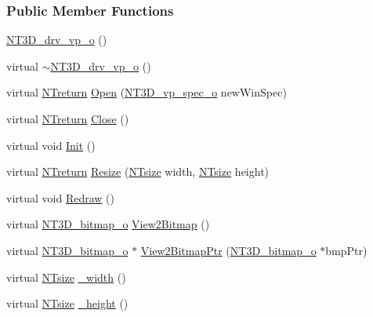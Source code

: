 \subsubsection*{Public Member Functions}
\begin{DoxyCompactItemize}
\item 
\hyperlink{class_n_t3_d__drv__vp__o_ad8b05bba5ab4afdfef02e682391fd06d}{NT3D\_\-drv\_\-vp\_\-o} ()
\item 
virtual \hyperlink{class_n_t3_d__drv__vp__o_a1a76848fa5516ff6897f73d7bc115592}{$\sim$NT3D\_\-drv\_\-vp\_\-o} ()
\item 
virtual \hyperlink{nt__types_8h_ab9564ee8f091e809d21b8451c6683c53}{NTreturn} \hyperlink{class_n_t3_d__drv__vp__o_aeb95f8a9906df2c9a09f26a2472eed1e}{Open} (\hyperlink{class_n_t3_d__vp__spec__o}{NT3D\_\-vp\_\-spec\_\-o} newWinSpec)
\item 
virtual \hyperlink{nt__types_8h_ab9564ee8f091e809d21b8451c6683c53}{NTreturn} \hyperlink{class_n_t3_d__drv__vp__o_a79a3f04b6896f0891c39a1a2904622ce}{Close} ()
\item 
virtual void \hyperlink{class_n_t3_d__drv__vp__o_a6bba99be18005a8de4dcefc7743c5a74}{Init} ()
\item 
virtual \hyperlink{nt__types_8h_ab9564ee8f091e809d21b8451c6683c53}{NTreturn} \hyperlink{class_n_t3_d__drv__vp__o_a244f59437173a5bec29068348a795bda}{Resize} (\hyperlink{nt__types_8h_a06c124f2e4469769b58230253ce0560b}{NTsize} width, \hyperlink{nt__types_8h_a06c124f2e4469769b58230253ce0560b}{NTsize} height)
\item 
virtual void \hyperlink{class_n_t3_d__drv__vp__o_afe6bec50fdef7285bda62a39a2441c43}{Redraw} ()
\item 
virtual \hyperlink{class_n_t3_d__bitmap__o}{NT3D\_\-bitmap\_\-o} \hyperlink{class_n_t3_d__drv__vp__o_a9e23b41139b05a0f05c97f284263981b}{View2Bitmap} ()
\item 
virtual \hyperlink{class_n_t3_d__bitmap__o}{NT3D\_\-bitmap\_\-o} $\ast$ \hyperlink{class_n_t3_d__drv__vp__o_a72ef9339925cf05076ccf3aae5d29d79}{View2BitmapPtr} (\hyperlink{class_n_t3_d__bitmap__o}{NT3D\_\-bitmap\_\-o} $\ast$bmpPtr)
\item 
virtual \hyperlink{nt__types_8h_a06c124f2e4469769b58230253ce0560b}{NTsize} \hyperlink{class_n_t3_d__drv__vp__o_a22e83e42a3c0646a99d7cdc4273353fb}{\_\-width} ()
\item 
virtual \hyperlink{nt__types_8h_a06c124f2e4469769b58230253ce0560b}{NTsize} \hyperlink{class_n_t3_d__drv__vp__o_af12c1ecca94476537e10c59d69834921}{\_\-height} ()
\end{DoxyCompactItemize}



